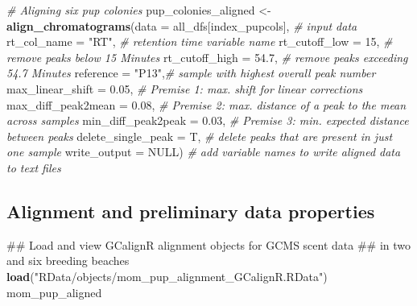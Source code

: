 \documentclass[]{article}
\newenvironment{Shaded}{\begin{snugshade}}{\end{snugshade}}
\newcommand{\KeywordTok}[1]{\textcolor[rgb]{0.13,0.29,0.53}{\textbf{#1}}}
\newcommand{\DataTypeTok}[1]{\textcolor[rgb]{0.13,0.29,0.53}{#1}}
\newcommand{\DecValTok}[1]{\textcolor[rgb]{0.00,0.00,0.81}{#1}}
\newcommand{\FloatTok}[1]{\textcolor[rgb]{0.00,0.00,0.81}{#1}}
\newcommand{\StringTok}[1]{\textcolor[rgb]{0.31,0.60,0.02}{#1}}
\newcommand{\CommentTok}[1]{\textcolor[rgb]{0.56,0.35,0.01}{\textit{#1}}}
\newcommand{\OtherTok}[1]{\textcolor[rgb]{0.56,0.35,0.01}{#1}}
\newcommand{\NormalTok}[1]{#1}
\begin{document}
\begin{Shaded}
\begin{Highlighting}[]
\CommentTok{# Aligning six pup colonies}
\NormalTok{pup_colonies_aligned <-}\StringTok{ }\KeywordTok{align_chromatograms}\NormalTok{(}\DataTypeTok{data =}\NormalTok{ all_dfs[index_pupcols], }\CommentTok{# input data}
                                         \DataTypeTok{rt_col_name =} \StringTok{"RT"}\NormalTok{, }\CommentTok{# retention time variable name }
                                         \DataTypeTok{rt_cutoff_low =} \DecValTok{15}\NormalTok{, }\CommentTok{# remove peaks below 15 Minutes}
                                         \DataTypeTok{rt_cutoff_high =} \FloatTok{54.7}\NormalTok{, }\CommentTok{# remove peaks exceeding 54.7 Minutes}
                                         \DataTypeTok{reference =} \StringTok{"P13"}\NormalTok{,}\CommentTok{# sample with highest overall peak number }
                                         \DataTypeTok{max_linear_shift =} \FloatTok{0.05}\NormalTok{, }\CommentTok{# Premise 1: max. shift for linear corrections}
                                         \DataTypeTok{max_diff_peak2mean =} \FloatTok{0.08}\NormalTok{, }\CommentTok{# Premise 2: max. distance of a peak to the mean across samples}
                                         \DataTypeTok{min_diff_peak2peak =} \FloatTok{0.03}\NormalTok{, }\CommentTok{# Premise 3: min. expected distance between peaks}
                                         \DataTypeTok{delete_single_peak =}\NormalTok{ T, }\CommentTok{# delete peaks that are present in just one sample }
                                         \DataTypeTok{write_output =} \OtherTok{NULL}\NormalTok{) }\CommentTok{# add variable names to write aligned data to text files}
\end{Highlighting}
\end{Shaded}

\subsection{Alignment and preliminary data
properties}\label{alignment-and-preliminary-data-properties}

\begin{Shaded}
\begin{Highlighting}[]
\NormalTok{## Load and view GCalignR alignment objects for GCMS scent data }
\NormalTok{## in two and six breeding beaches}
\KeywordTok{load}\NormalTok{(}\StringTok{"RData/objects/mom_pup_alignment_GCalignR.RData"}\NormalTok{)}
\NormalTok{mom_pup_aligned}
\end{Highlighting}
\end{Shaded}
\end{document}

